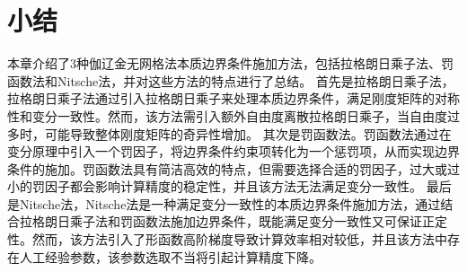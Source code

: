 \section{小结}
本章介绍了3种伽辽金无网格法本质边界条件施加方法，包括拉格朗日乘子法、罚函数法和Nitsche法，并对这些方法的特点进行了总结。
首先是拉格朗日乘子法，拉格朗日乘子法通过引入拉格朗日乘子来处理本质边界条件，满足刚度矩阵的对称性和变分一致性。然而，该方法需引入额外自由度离散拉格朗日乘子，当自由度过多时，可能导致整体刚度矩阵的奇异性增加。
其次是罚函数法。罚函数法通过在变分原理中引入一个罚因子，将边界条件约束项转化为一个惩罚项，从而实现边界条件的施加。罚函数法具有简洁高效的特点，但需要选择合适的罚因子，过大或过小的罚因子都会影响计算精度的稳定性，并且该方法无法满足变分一致性。
最后是Nitsche法，Nitsche法是一种满足变分一致性的本质边界条件施加方法，通过结合拉格朗日乘子法和罚函数法施加边界条件，既能满足变分一致性又可保证正定性。然而，该方法引入了形函数高阶梯度导致计算效率相对较低，并且该方法中存在人工经验参数，该参数选取不当将引起计算精度下降。




